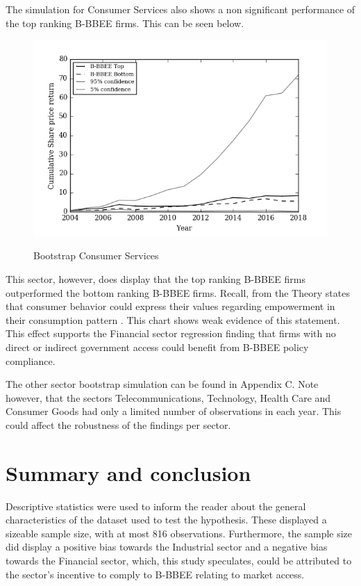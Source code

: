 The simulation for Consumer Services also shows a non significant performance of the top ranking B-BBEE firms. This can be seen below.
\begin{figure}[H]
  \centering
  \includegraphics [scale=0.75]{"Images/Bootstrap_Consumer Services_Cumulative"} \\
  {\small {\it \caption{Bootstrap Consumer Services \label{fig:moun} }}}
\end{figure}
This sector, however, does display that the top ranking B-BBEE firms outperformed the bottom ranking B-BBEE firms. Recall, from the Theory states that  consumer behavior could express their values regarding empowerment in their consumption pattern \cite[p378]{N34}. This chart shows weak evidence of this statement. This effect supports the Financial sector regression finding that firms with no direct or indirect government access could benefit from B-BBEE policy compliance.

The other sector bootstrap simulation can be found in Appendix C. Note however, that the sectors Telecommunications, Technology, Health Care and Consumer Goods had only a limited number of observations in each year. This could affect the robustness of the findings per sector. 
\section{Summary and conclusion}
Descriptive statistics were used to inform the reader about the general characteristics of the dataset used to test the hypothesis. These displayed a sizeable sample size, with at most 816 observations. Furthermore, the sample size did display a positive bias towards the Industrial sector and a negative bias towards the Financial sector, which, this study speculates, could be attributed to the sector’s incentive to comply to B-BBEE relating to market access.

